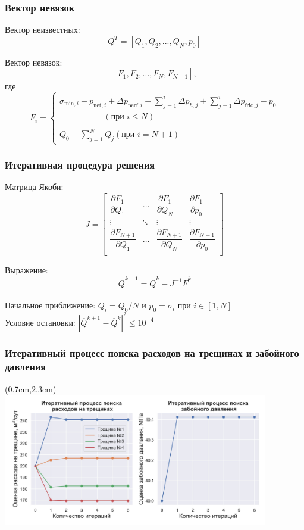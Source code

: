 \documentclass{beamer}
\begin{document}
\begin{frame}
\frametitle{Вектор невязок}

Вектор неизвестных:
$$Q^T=\left[Q_1,Q_2,...,Q_N,p_0\right]$$

Вектор невязок:
$$\left[F_1,F_2,...,F_N,F_{N+1}\right],$$
где
$$
F_i=
\begin{cases}
\sigma_{\text{min},i}+p_{\text{net},i}+\Delta p_{\text{perf},i}-\sum\limits_{j=1}^{i}{\Delta p_{h,j}}+\sum\limits_{j=1}^{i}{\Delta p_{\text{fric},j}}-p_0\\\,\,\,\,\,\,\,\,\,\,\,\,\,\,\,\,\,\,\,\,\,\,\,\,\,\,\,\,\,\,\,\,\left(\text{при }i\leqslant N\right)\\\ \\
Q_0-\sum\limits_{j=1}^{N}{Q_j}\left(\text{при }i=N+1\right)
\end{cases}
$$

\end{frame}


\begin{frame}
\frametitle{Итеративная процедура решения}
Матрица Якоби:
$$J = \begin{bmatrix}
	\dfrac{\partial F_1}{\partial Q_1} & \dots & \dfrac{\partial F_1}{\partial Q_N} & \dfrac{\partial F_1}{\partial p_0} \\
	\vdots & \ddots & \vdots & \vdots \\
	\dfrac{\partial F_{N+1}}{\partial Q_1} & \dots & \dfrac{\partial F_{N+1}}{\partial Q_N} & \dfrac{\partial F_{N+1}}{\partial p_0} \\
	\end{bmatrix}
$$

Выражение:
$$\overline{Q}^{k+1}=\overline{Q}^k-J^{-1}\overline{F}^k$$
\ \\

Начальное приближение:
$Q_i=Q_0/N\text{ и }p_0=\sigma_i\text{ при } i\in\left[1,N\right]$
\ \\

Условие остановки:
$\left|\overline{Q}^{k+1}-\overline{Q}^k\right|^2\leqslant10^{-4}$

\end{frame}


\begin{frame}
\frametitle{Итеративный процесс поиска расходов на трещинах и забойного давления}

\begin{textblock*}{11.6cm}(0.7cm,2.3cm)
\includegraphics[width=11.6cm]{flows_distribution_between_fractures_1.jpg}
\end{textblock*}

\end{frame}
\end{document}
